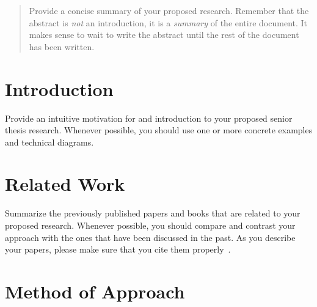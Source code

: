 \documentclass[11pt]{article}
\begin{document}

\begin{quote}

Provide a concise summary of your proposed research. Remember that the abstract
is {\it not\/} an introduction, it is a {\it summary\/} of the entire document.
It makes sense to wait to write the abstract until the rest of the document has
been written.

\end{quote}

\section{Introduction}
\label{sec:introduction}


Provide an intuitive motivation for and introduction to your proposed
senior thesis research. Whenever possible, you should use one or more
concrete examples and technical diagrams.

\section{Related Work}
\label{sec:relatedwork}


Summarize the previously published papers and books that are related
to your proposed research. Whenever possible, you should compare and
contrast your approach with the ones that have been discussed in the
past. As you describe your papers, please make sure that you cite
them properly~\cite{conrad-gecco-selection-study}.

\section{Method of Approach}
\label{sec:method}
\end{document}
